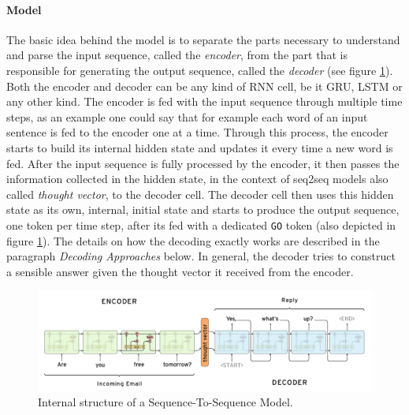 \paragraph{Model}
The basic idea behind the model is to separate the parts necessary to understand and parse the input sequence, called the \emph{encoder}, from the part that is responsible for generating the output sequence, called the \emph{decoder} (see figure \ref{fundamentals:seq2seq:internal_structure}). Both the encoder and decoder can be any kind of RNN cell, be it GRU, LSTM or any other kind. The encoder is fed with the input sequence through multiple time steps, as an example one could say that for example each word of an input sentence is fed to the encoder one at a time. Through this process, the encoder starts to build its internal hidden state and updates it every time a new word is fed. After the input sequence is fully processed by the encoder, it then passes the information collected in the hidden state, in the context of seq2seq models also called \emph{thought vector}, to the decoder cell. The decoder cell then uses this hidden state as its own, internal, initial state and starts to produce the output sequence, one token per time step, after its fed with a dedicated \texttt{GO} token (also depicted in figure \ref{fundamentals:seq2seq:internal_structure}). The details on how the decoding exactly works are described in the paragraph \emph{Decoding Approaches} below. In general, the decoder tries to construct a sensible answer given the thought vector it received from the encoder.

\begin{figure}[h]
	\label{fundamentals:seq2seq:internal_structure}
	\centering
	\includegraphics[width=12cm]{img/seq2seq_internal}
	\caption{Internal structure of a Sequence-To-Sequence Model.\protect\footnotemark}
\end{figure}

